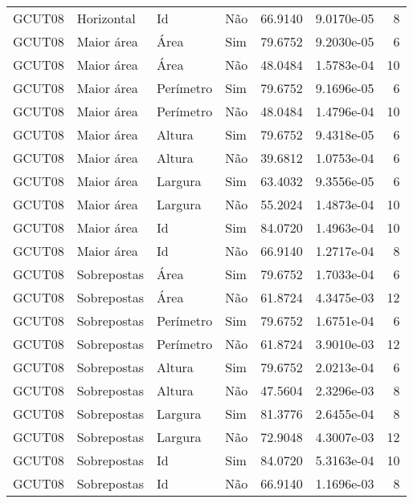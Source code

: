 \begin{tabular}{llllrrr}
GCUT08    & Horizontal  & Id        & Não         & 66.9140      & 9.0170e-05 & 8        \\
GCUT08    & Maior área  & Área      & Sim         & 79.6752      & 9.2030e-05 & 6        \\
GCUT08    & Maior área  & Área      & Não         & 48.0484      & 1.5783e-04 & 10       \\
GCUT08    & Maior área  & Perímetro & Sim         & 79.6752      & 9.1696e-05 & 6        \\
GCUT08    & Maior área  & Perímetro & Não         & 48.0484      & 1.4796e-04 & 10       \\
GCUT08    & Maior área  & Altura    & Sim         & 79.6752      & 9.4318e-05 & 6        \\
GCUT08    & Maior área  & Altura    & Não         & 39.6812      & 1.0753e-04 & 6        \\
GCUT08    & Maior área  & Largura   & Sim         & 63.4032      & 9.3556e-05 & 6        \\
GCUT08    & Maior área  & Largura   & Não         & 55.2024      & 1.4873e-04 & 10       \\
GCUT08    & Maior área  & Id        & Sim         & 84.0720      & 1.4963e-04 & 10       \\
GCUT08    & Maior área  & Id        & Não         & 66.9140      & 1.2717e-04 & 8        \\
GCUT08    & Sobrepostas & Área      & Sim         & 79.6752      & 1.7033e-04 & 6        \\
GCUT08    & Sobrepostas & Área      & Não         & 61.8724      & 4.3475e-03 & 12       \\
GCUT08    & Sobrepostas & Perímetro & Sim         & 79.6752      & 1.6751e-04 & 6        \\
GCUT08    & Sobrepostas & Perímetro & Não         & 61.8724      & 3.9010e-03 & 12       \\
GCUT08    & Sobrepostas & Altura    & Sim         & 79.6752      & 2.0213e-04 & 6        \\
GCUT08    & Sobrepostas & Altura    & Não         & 47.5604      & 2.3296e-03 & 8        \\
GCUT08    & Sobrepostas & Largura   & Sim         & 81.3776      & 2.6455e-04 & 8        \\
GCUT08    & Sobrepostas & Largura   & Não         & 72.9048      & 4.3007e-03 & 12       \\
GCUT08    & Sobrepostas & Id        & Sim         & 84.0720      & 5.3163e-04 & 10       \\
GCUT08    & Sobrepostas & Id        & Não         & 66.9140      & 1.1696e-03 & 8        \\
\hline
\end{tabular}